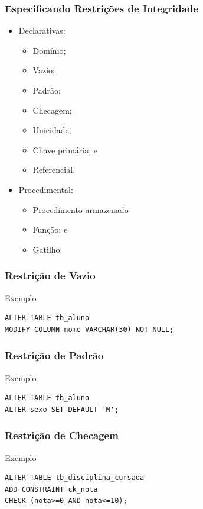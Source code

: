 \documentclass{beamer}
\begin{document}
\begin{frame}
\frametitle{Especificando Restrições de Integridade}

\begin{itemize}
	\item Declarativas:
	\begin{itemize}
		\item Domínio;
		\item Vazio;
		\item Padrão;
		\item Checagem;
		\item Unicidade;
		\item Chave primária; e
		\item Referencial.
	\end{itemize}
	\item Procedimental:
	\begin{itemize}
	\item Procedimento armazenado
	\item Função; e
	\item Gatilho.
	\end{itemize}
\end{itemize}
\end{frame}

\begin{frame}[fragile]
\frametitle{Restrição de Vazio}

\begin{exampleblock}{Exemplo}
\begin{lstlisting}
ALTER TABLE tb_aluno
MODIFY COLUMN nome VARCHAR(30) NOT NULL;
\end{lstlisting}
\end{exampleblock}
\end{frame}

\begin{frame}[fragile]
\frametitle{Restrição de Padrão}

\begin{exampleblock}{Exemplo}
\begin{lstlisting}
ALTER TABLE tb_aluno
ALTER sexo SET DEFAULT 'M';
\end{lstlisting}
\end{exampleblock}
\end{frame}

\begin{frame}[fragile]
\frametitle{Restrição de Checagem}

\begin{exampleblock}{Exemplo}
\begin{lstlisting}
ALTER TABLE tb_disciplina_cursada
ADD CONSTRAINT ck_nota 
CHECK (nota>=0 AND nota<=10);
\end{lstlisting}
\end{exampleblock}
\end{frame}
\end{document}
